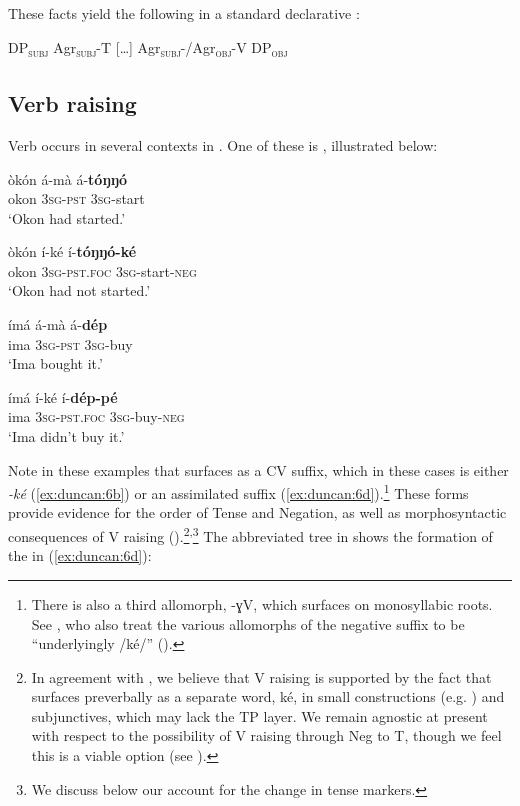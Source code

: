 \documentclass[output=paper,
modfonts
]{langscibook}
\begin{document}
\noindent These facts yield the following  in a standard declarative :

\ea \label{ex:duncan:5}
{DP\textsc{\textsubscript{subj}} Agr\textsc{\textsubscript{subj}}-T […] Agr\textsc{\textsubscript{subj}}-/Agr\textsc{\textsubscript{obj}}-V DP\textsc{\textsubscript{obj}}}
\z

\subsection{Verb raising}

Verb  occurs in several contexts in . One of these is , illustrated below:

\settowidth{}
\ea\label{ex:duncan:6}
\ea 
\gll òkón á-mà á-\textbf{tóŋŋó}\\
 okon 3\textsc{sg-pst} \textsc{3sg}-start\\
\glt ‘Okon had started.’

\ex\label{ex:duncan:6b}
\gll òkón í-ké í-\textbf{tóŋŋó-ké} \\
 okon 3\textsc{sg-pst.foc} \textsc{3sg}-start-\textsc{neg}\\
\glt ‘Okon had not started.’

\ex
\gll ímá á-mà á-\textbf{dép}\\
 ima 3\textsc{sg-pst} \textsc{3sg}-buy\\
\glt ‘Ima bought it.’

\ex\label{ex:duncan:6d}
\gll ímá í-ké í-\textbf{dép-pé}\\
 ima 3\textsc{sg-pst.foc} \textsc{3sg}-buy-\textsc{neg}\\
\glt ‘Ima didn’t buy it.’
\z
\z


Note in these examples that  surfaces as a CV suffix, which in these cases is either \textit{-ké} (\ref{ex:duncan:6b}) or an assimilated suffix (\ref{ex:duncan:6d}).\footnote{There is also a third allomorph, -ɣV, which surfaces on monosyllabic  roots. See \citet{AkinlabiUrua2002}, who also treat the various allomorphs of the negative suffix to be “underlyingly /ké/” (\citealt[127]{AkinlabiUrua2002}).} These forms provide evidence for the order of Tense and Negation, as well as morphosyntactic consequences of V raising (\citealt{BakerWillie2010}).\footnote{In agreement with \citet{BakerWillie2010}, we believe that V raising is supported by the fact that  surfaces preverbally as a separate word, ké, in small  constructions (e.g. ) and subjunctives, which may lack the TP layer. We remain agnostic at present with respect to the possibility of V raising through Neg to T, though we feel this is a viable option (see \citealt{Baker2008}).}\textsuperscript{,}\footnote{We discuss below our account for the change in tense markers.}\textsuperscript{ }The abbreviated tree in  shows the formation of the  in (\ref{ex:duncan:6d}):
\end{document}
